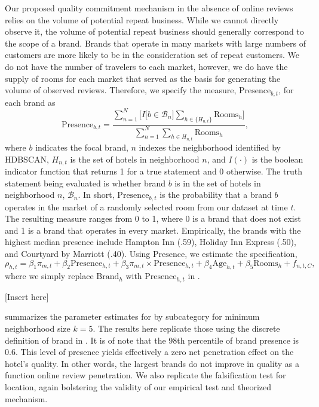 \documentclass[12pt, leqno]{article}
\begin{document}
Our proposed quality commitment mechanism in the absence of online reviews relies on the volume of potential repeat business. While we cannot directly observe it, the volume of potential repeat business should generally correspond to the scope of a brand. Brands that operate in many markets with large numbers of customers are more likely to be in the consideration set of repeat customers. We do not have the number of travelers to each market, however, we do have the supply of rooms for each market that served as the basis for generating the volume of observed reviews. Therefore, we specify the measure, $\text{Presence}_{b,t}$, for each brand as
\begin{equation}
\text{Presence}_{b,t}=\frac{\sum_{n=1}^N\bigg[ I\big[b\in \mathcal{B}_n\big]\sum_{h\in \{H_{n,t}\}}\text{Rooms}_{h} \bigg]}{\sum_{n=1}^{N}\sum_{h\in H_{n,t}}\text{Rooms}_h},
\end{equation}
where $b$ indicates the focal brand, $n$ indexes the neighborhood identified by HDBSCAN, $H_{n,t}$ is the set of hotels in neighborhood $n$, and $I(\cdot)$ is the boolean indicator function that returns 1 for a true statement and 0 otherwise. The truth statement being evaluated is whether brand $b$ is in the set of hotels in neighborhood $n$, $\mathcal{B}_n$. In short, $\text{Presence}_{b,t}$ is the probability that a brand $b$ operates in the market of a randomly selected room from our dataset at time $t$. The resulting measure ranges from 0 to 1, where 0 is a brand that does not exist and 1 is a brand that operates in every market. Empirically, the brands with the highest median presence include Hampton Inn (.59), Holiday Inn Express (.50), and Courtyard by Marriott (.40). Using $\text{Presence}$, we estimate the specification,
\begin{equation}\label{eq:nbhd_presence}
\rho_{h,t}=\beta_{1} \pi_{m,t} + \beta_{2} \text{Presence}_{h,t} + \beta_{3} \pi_{m,t}\times \text{Presence}_{h,t} + \beta_{4}\text{Age}_{h,t} + \beta_{5} \text{Rooms}_{h} + f_{n,t,C},
\end{equation}
where we simply replace $\text{Brand}_h$ with $\text{Presence}_{h,t}$ in .  

[Insert  here]

 summarizes the parameter estimates for  by subcategory for minimum neighborhood size $k=5$. The results here replicate those using the discrete definition of brand in . It is of note that the 98th percentile of brand presence is 0.6. This level of presence yields effectively a zero net penetration effect on the hotel's quality. In other words, the largest brands do not improve in quality as a function online review penetration. We also replicate the falsification test for location, again bolstering the validity of our empirical test and theorized mechanism.
\end{document}
